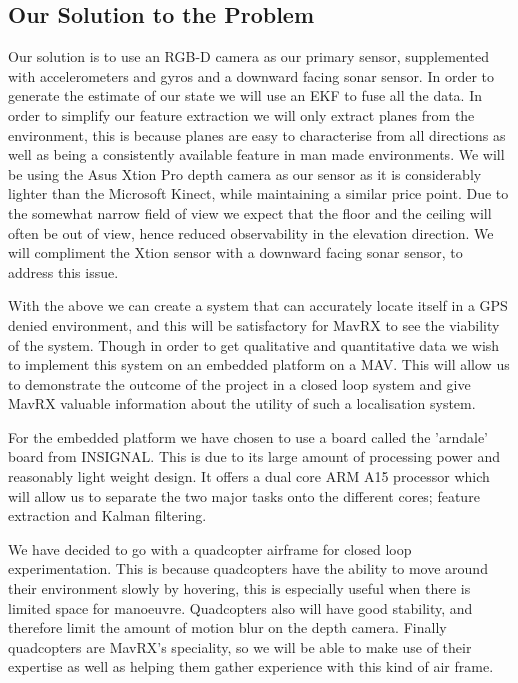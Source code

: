 \documentclass[]{article}
\begin{document}
{\subsection{Our Solution to the Problem} %
\label{sub:our_solution_to_the_problem}

Our solution is to use an \ac{RGB-D} camera as our primary sensor, supplemented with accelerometers and gyros and a downward facing sonar sensor. In order to generate the estimate of our state we will use an \ac{EKF} to fuse all the data. In order to simplify our feature extraction we will only extract planes from the environment, this is because planes are easy to characterise from all directions as well as being a consistently available feature in man made environments. We will be using the Asus Xtion Pro depth camera as our sensor as it is considerably lighter than the Microsoft Kinect, while maintaining a similar price point. Due to the somewhat narrow field of view we expect that the floor and the ceiling will often be out of view, hence reduced observability in the elevation direction. We will compliment the Xtion sensor with a downward facing sonar sensor, to address this issue.

With the above we can create a system that can accurately locate itself in a \ac{GPS} denied environment, and this will be satisfactory for MavRX to see the viability of the system. Though in order to get qualitative and quantitative data we wish to implement this system on an embedded platform on a \ac{MAV}. This will allow us to demonstrate the outcome of the project in a closed loop system and give MavRX valuable information about the utility of such a localisation system. 

For the embedded platform we have chosen to use a board called the 'arndale' board from INSIGNAL. This is due to its large amount of processing power and reasonably light weight design. It offers a dual core ARM A15 processor which will allow us to separate the two major tasks onto the different cores; feature extraction and Kalman filtering. 

We have decided to go with a quadcopter airframe for closed loop experimentation. This is because quadcopters have the ability to move around their environment slowly by hovering, this is especially useful when there is limited space for manoeuvre. Quadcopters also will have good stability, and therefore limit the amount of motion blur on the depth camera. Finally quadcopters are MavRX's speciality, so we will be able to make use of their expertise as well as helping them gather experience with this kind of air frame. 


}
\end{document}
